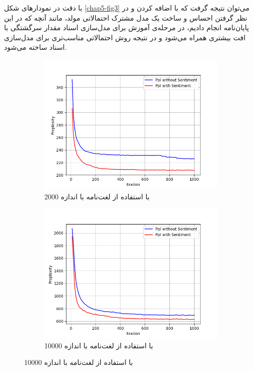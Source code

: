 با دقت در نمودار‌های شکل
\ref{chap5-fig3}
می‌توان نتیجه گرفت که با اضافه کردن و در نظر گرفتن احساس و ساخت یک مدل مشترک احتمالاتی مولد، مانند آنچه که در این پایان‌‌نامه انجام دادیم، در مرحله‌ی آموزش برای مدل‌سازی اسناد مقدار سرگشتگی با افت بیشتری همراه می‌‌شود و در نتیجه روش احتمالاتی مناسب‌تری برای مدل‌سازی اسناد ساخته می‌‌شود.
	\begin{figure}[!t]
		\centering
		\begin{subfigure}{.45\textwidth}
			\includegraphics[scale = .4]{chap5-img/ppl_2000}
			\caption{ با استفاده از  لغت‌نامه با اندازه 2000}
			\label{chap5-fig3sub1}
		\end{subfigure}		
		\begin{subfigure}{.45\textwidth}
			\includegraphics[scale =.4]{chap5-img/ppl_10000}
			\caption{ با استفاده از  لغت‌نامه با اندازه 10000 }
			\label{chap5-fig3sub2}
		\end{subfigure}
		

\end{figure}

